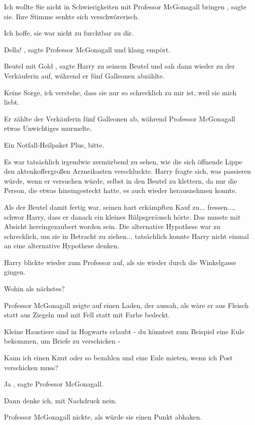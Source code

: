 \glqq Ich wollte Sie nicht in Schwierigkeiten mit Professor McGonagall
bringen\grqq{} , sagte sie. Ihre Stimme senkte sich verschwörerisch.

\glqq Ich hoffe, sie war nicht zu furchtbar zu dir.\grqq{}

\glqq Della!\grqq{} , sagte Professor McGonagall und klang empört.

\glqq Beutel mit Gold\grqq{} , sagte Harry zu seinem Beutel und sah dann wieder
zu der Verkäuferin auf, während er fünf Galleonen abzählte.

\glqq Keine Sorge, ich verstehe, dass sie nur so schrecklich zu mir ist, weil
sie mich liebt.\grqq{}

Er zählte der Verkäuferin fünf Galleonen ab, während Professor McGonagall etwas
Unwichtiges murmelte.

\glqq Ein Notfall-Heilpaket Plus, bitte.\grqq{}

Es war tatsächlich irgendwie zermürbend zu sehen, wie die sich öffnende Lippe
den aktenkoffergroßen Arzneikasten verschluckte. Harry fragte sich, was
passieren würde, wenn er versuchen würde, selbst in den Beutel zu klettern,
da nur die Person, die etwas hineingesteckt hatte, es auch wieder
herausnehmen konnte.

Als der Beutel damit fertig war, seinen hart erkämpften Kauf zu... fressen...,
schwor Harry, dass er danach ein kleines Rülpsgeräusch hörte. Das musste mit
Absicht hereingezaubert worden sein. Die alternative Hypothese war zu
schrecklich, um sie in Betracht zu ziehen... tatsächlich konnte Harry nicht
einmal an eine alternative Hypothese denken.

Harry blickte wieder zum Professor auf, als sie wieder durch die Winkelgasse
gingen.

\glqq Wohin als nächstes?\grqq{}

Professor McGonagall zeigte auf einen Laden, der aussah, als wäre er aus Fleisch
statt aus Ziegeln und mit Fell statt mit Farbe bedeckt.

\glqq Kleine Haustiere sind in Hogwarts erlaubt - du könntest zum Beispiel eine
Eule bekommen, um Briefe zu verschicken -\grqq{}

\glqq Kann ich einen Knut oder so bezahlen und eine Eule mieten, wenn ich Post
verschicken muss?\grqq{}

\glqq Ja\grqq{} , sagte Professor McGonagall.

\glqq Dann denke ich, mit Nachdruck nein.\grqq{}

Professor McGonagall nickte, als würde sie einen Punkt abhaken.

